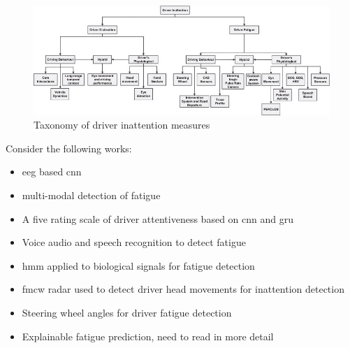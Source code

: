 \documentclass[11pt, parskip=half*,twoside=false]{scrbook}
\begin{document}
\begin{figure} 
	\centering
	\includegraphics[width=\textwidth]{inattention_inputs_taxonomy} 
	\caption{Taxonomy of driver inattention measures}
	\label{fig:taxonomy_measures}
\end{figure}

Consider the following works:
\begin{itemize}
 	\item \citet{gaoEEGBasedSpatioTemporal2019} \gls{eeg} based \gls{cnn}
	\item \citet{crayeMultiModalDriverFatigue2016} multi-modal detection of fatigue
	\item \citet{duaAutoRateHowAttentive2019}  A five rating scale of driver attentiveness based on \gls{cnn} and \gls{gru}
	\item \citet{greeleyDetectingFatigueVoice2006} Voice audio and speech recognition to detect fatigue
	\item \citet{fuDynamicDriverFatigue2016} \gls{hmm} applied to biological signals for fatigue detection
	\item \citet{dingInattentiveDrivingBehavior2019} \gls{fmcw} radar used to detect driver head movements for inattention detection
	\item \citet{liOnlineDetectionDriver2017} Steering wheel angles for driver fatigue detection
	\item \citet{zhouPredictingDriverFatigue2021} Explainable fatigue prediction, need to read in more detail
	
\end{itemize}
\end{document}
